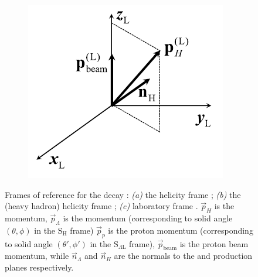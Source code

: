 \begin{figure}[t]
\begin{subfigure}{.32\textwidth}
		\caption{}
		\label{fig:1:frames_of_reference_heavy}
	\end{subfigure}
	\begin{subfigure}{.32\textwidth}
		\includegraphics[width=\textwidth]{graphics/01-standard_model/helicity_frames_c.png}
		\caption{}
		\label{fig:1:frames_of_reference_lab}
	\end{subfigure}
	\caption[Frames of reference for the \demonstratorfull decay.]{Frames of reference for the \demonstratorfull decay \cite{EMDipoleSearch}: \textit{(a)} the \lz helicity frame \slambdal; \textit{(b)} the \lbz (heavy hadron) helicity frame \shad; \textit{(c)} laboratory frame \slab.
	$\vec{p}_H$ is the \lbz momentum,
	$\vec{p}_\Lambda$ is the \lz momentum (corresponding to solid angle $(\theta,\phi)$ in the $\text{S}_{\text{H}}$ frame)
	$\vec{p}_p$ is the proton momentum (corresponding to solid angle $(\theta',\phi')$ in the $\text{S}_{\Lambda\text{L}}$ frame),
	$\vec{p}_\text{beam}$ is the proton beam momentum,
	while $\vec{n}_\Lambda$ and $\vec{n}_H$ are the normals to the \lz and \lbz production planes respectively.}
	\label{fig:frames_of_reference}
\end{figure}

\label{info:wick}

